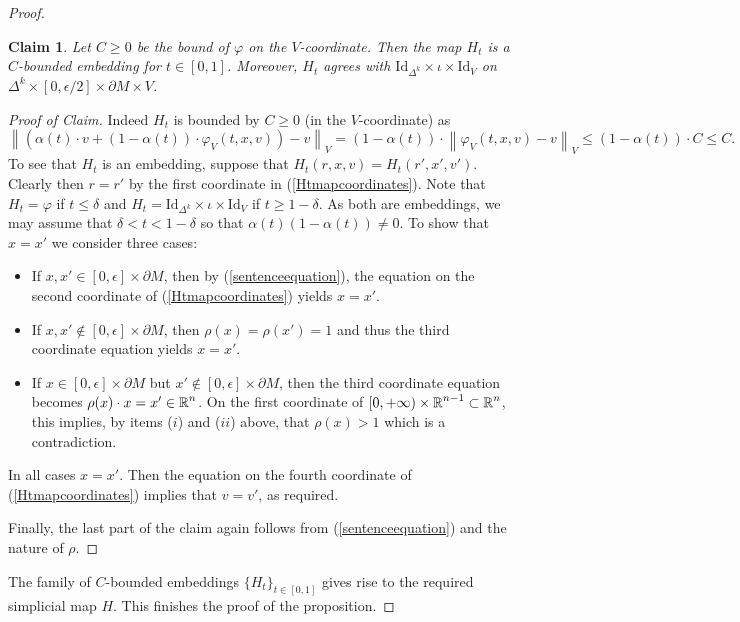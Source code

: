\documentclass[a4paper, oneside]{amsart}
\newcommand{\Id}{\mathrm{Id}}
\newcommand{\1}{\mathds{1}}
\newtheorem*{cl}{Claim}
\theoremstyle{remark}
\theoremstyle{definition}
\newcommand{\norm}[1]{\left\lVert #1 \right\rVert }
\newcommand{\R}{{\scaleobj{0.97}{\mathbb{R}}}}
\numberwithin{equation}{section}
\begin{document}
\begin{proof}
\begin{cl}
    Let $C\geq 0$ be the bound of $\varphi$ on the $V$-coordinate. Then the map $H_t$ is a $C$-bounded embedding for $t\in [0,1]$. Moreover, $H_t$ agrees with $\Id_{\Delta^k}\times\iota\times\Id_V$ on $\Delta^k\times [0,\epsilon/2]\times \partial M\times V$.
\end{cl}
\begin{proof}[Proof of Claim]
    Indeed $H_t$ is bounded by $C\geq0$ (in the $V$-coordinate) as
    $$
\norm{(\alpha(t)\cdot v+(1-\alpha(t))\cdot \varphi_V(t,x,v))-v}_V=(1-\alpha(t))\cdot\norm{\varphi_V(t,x,v)-v}_V\leq(1-\alpha(t))\cdot C\leq C. 
    $$
To see that $H_t$ is an embedding, suppose that $H_t(r,x,v)=H_t(r',x',v')$. Clearly then $r=r'$ by the first coordinate in (\ref{Htmapcoordinates}). Note that $H_t=\varphi$ if $t\leq \delta$ and $H_t=\Id_{\Delta^k}\times\iota\times \Id_{V}$ if $t\geq 1-\delta$. As both are embeddings, we may assume that $\delta<t<1-\delta$ so that $\alpha(t)(1-\alpha(t))\neq 0$. To show that $x=x'$ we consider three cases:
\begin{itemize}
    \item If $x,x'\in[0,\epsilon]\times \partial M$, then by (\ref{sentenceequation}), the equation on the second coordinate of (\ref{Htmapcoordinates}) yields $x=x'$.

    \item If $x,x'\notin [0,\epsilon]\times \partial M$, then $\rho(x)=\rho(x')=1$ and thus the third coordinate equation yields $x=x'$.

    \item  If $x\in [0,\epsilon]\times \partial M$ but $x'\notin [0,\epsilon]\times \partial M$, then the third coordinate equation becomes $\rho(x)\cdot x=x'\in \R^n$. On the first coordinate of $[0,+\infty)\times \R^{n-1}\subset \R^n$, this implies, by items ($i$) and ($ii$) above, that $\rho(x)>1$ which is a contradiction. 
\end{itemize}
    In all cases $x=x'$. Then the equation on the fourth coordinate of (\ref{Htmapcoordinates}) implies that $v=v'$, as required. 

    Finally, the last part of the claim again follows from (\ref{sentenceequation}) and the nature of $\rho$. 
\end{proof}
The family of $C$-bounded embeddings $\{H_t\}_{t\in [0,1]}$ gives rise to the required simplicial map $H$. This finishes the proof of the proposition.
\end{proof}
\end{document}
